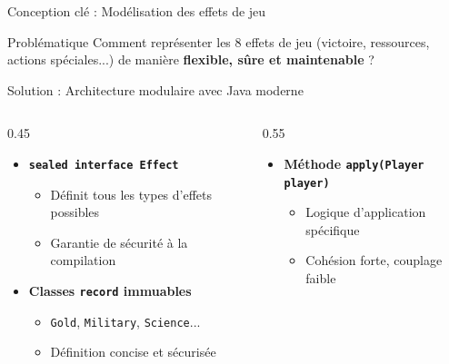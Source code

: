 \documentclass[10pt,french]{beamer}
\begin{document}
\begin{frame}{Conception clé : Modélisation des effets de jeu}
    \begin{block}{Problématique}
        Comment représenter les 8 effets de jeu (victoire, ressources, actions spéciales...) de manière \textbf{flexible, sûre et maintenable} ?
    \end{block}

    \vspace{0.3cm}
    
    \begin{exampleblock}{Solution : Architecture modulaire avec Java moderne}
        \begin{columns}
            \begin{column}{0.45\textwidth}
                \begin{itemize}
                    \item \textbf{\texttt{sealed interface Effect}}
                    \begin{itemize}
                        \footnotesize
                        \item Définit tous les types d'effets possibles
                        \item Garantie de sécurité à la compilation
                    \end{itemize}
                    \item \textbf{Classes \texttt{record} immuables}
                    \begin{itemize}
                        \footnotesize
                        \item \texttt{Gold}, \texttt{Military}, \texttt{Science}...
                        \item Définition concise et sécurisée
                    \end{itemize}
                \end{itemize}
            \end{column}
            \begin{column}{0.55\textwidth}
                \begin{itemize}
                    \item \textbf{Méthode \texttt{apply(Player player)}}
                    \begin{itemize}
                        \footnotesize
                        \item Logique d'application spécifique
                        \item Cohésion forte, couplage faible

\end{itemize}
\end{itemize}
\end{column}
\end{columns}
\end{exampleblock}
\end{frame}
\end{document}
